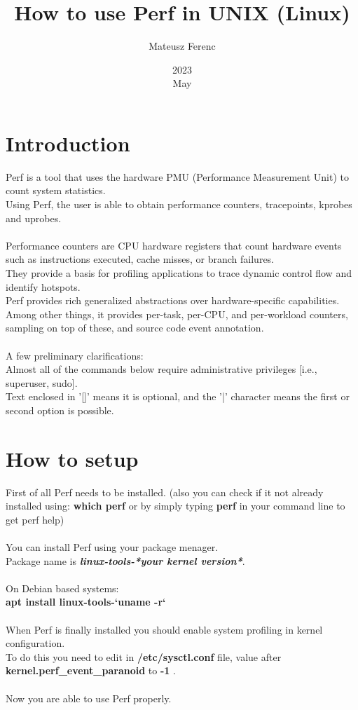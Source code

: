 \documentclass[11pt,onecolumn]{article}
\title{How to use Perf in UNIX (Linux)}
\author{Mateusz Ferenc}
\date{2023\\ May}
\begin{document}
	
\maketitle
	
\section*{Introduction}

Perf is a tool that uses the hardware PMU (Performance Measurement Unit) to count system statistics.\\
Using Perf, the user is able to obtain performance counters, tracepoints, kprobes and uprobes.\\\\
Performance counters are CPU hardware registers that count hardware events such as instructions executed, cache misses, or branch failures. \\
They provide a basis for profiling applications to trace dynamic control flow and identify hotspots.\\
Perf provides rich generalized abstractions over hardware-specific capabilities. \\
Among other things, it provides per-task, per-CPU, and per-workload counters, sampling on top of these, and source code event annotation.\\\\
A few preliminary clarifications:\\
Almost all of the commands below require administrative privileges [i.e., superuser, sudo].\\
Text enclosed in '[]' means it is optional, and the '|' character means the first or second option is possible.

\section{How to setup}

First of all Perf needs to be installed. (also you can check if it not already installed using: \textbf{which perf} or by simply typing \textbf{perf} in your command line to get perf help)\\\\
You can install Perf using your package menager. \\
Package name is \textbf{\textit{linux-tools-*your kernel version*}}.\\\\
On Debian based systems:\\
\quad\textbf{apt install linux-tools-`uname -r`}\\\\
When Perf is finally installed you should enable system profiling in kernel configuration.\\
To do this you need to edit in \textbf{/etc/sysctl.conf} file, value after \textbf{kernel.perf\_event\_paranoid} to \textbf{-1} .\\\\
Now you are able to use Perf properly.
\end{document}
